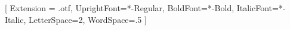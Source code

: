 \documentclass{article}
\begin{document}
\phantom{.}

\newpage
\phantom{.}

\newpage
\phantom{.}

\newpage
\phantom{.}

\newpage
\phantom{.}

\newpage
\phantom{.}

\newpage
\phantom{.}
 
\newpage
\phantom{.}
 
\newpage
\phantom{.}

\newpage
\phantom{.}
 
\newpage
\phantom{.}
\newfontfamily{}[
  Extension = .otf,
  UprightFont=*-Regular,
  BoldFont=*-Bold,
  ItalicFont=*-Italic,
  LetterSpace=2,
  WordSpace=.5
  ]

\newpage
\phantom{.}

\newpage
\phantom{.}

\newpage
\phantom{.}

\newpage
\phantom{.}

\newpage
\phantom{.}


	
\end{document}
